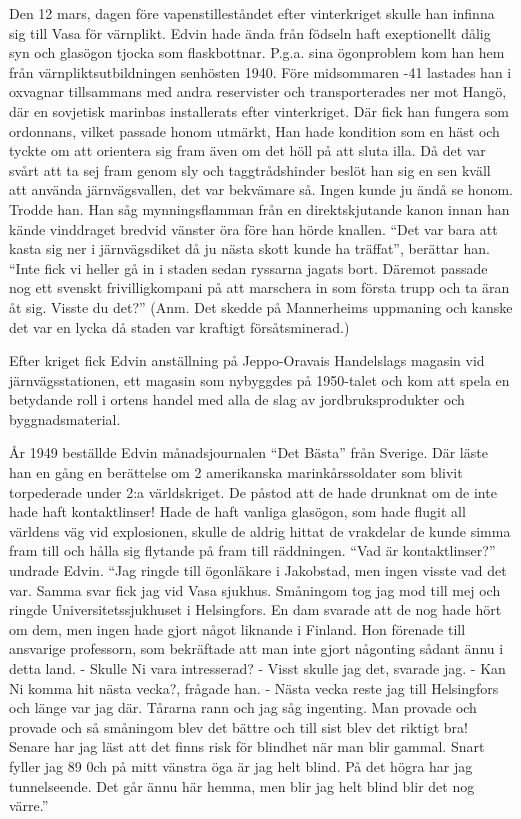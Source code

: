 Den 12 mars, dagen före vapenstilleståndet efter vinterkriget skulle han infinna sig till Vasa för värnplikt. Edvin hade ända från födseln haft exeptionellt dålig syn och glasögon tjocka som flaskbottnar. P.g.a. sina ögonproblem kom han hem från värnpliktsutbildningen senhösten 1940. Före midsommaren -41 lastades han i oxvagnar tillsammans med andra reservister och transporterades ner mot Hangö, där en sovjetisk marinbas installerats efter vinterkriget. Där fick han fungera som ordonnans, vilket passade honom utmärkt, Han hade kondition som en häst och tyckte om att orientera sig fram även om det höll på att sluta illa. Då det var svårt att ta sej fram genom sly och taggtrådshinder beslöt han sig en sen kväll att använda järnvägsvallen, det var bekvämare så. Ingen kunde ju ändå se honom. Trodde han. Han såg mynningsflamman från en direktskjutande kanon innan han kände vinddraget bredvid vänster öra före han hörde knallen. ``Det var bara att kasta sig ner i järnvägsdiket då ju nästa skott kunde ha träffat'', berättar han. ``Inte fick vi heller gå in i staden sedan ryssarna jagats bort. Däremot passade nog ett svenskt frivilligkompani på att marschera in som första trupp och ta äran åt sig. Visste du det?''
(Anm. Det skedde på Mannerheims uppmaning och kanske det var en lycka då staden var kraftigt försåtsminerad.)

Efter kriget fick Edvin anställning på Jeppo-Oravais Handelslags magasin vid järnvägsstationen, ett magasin som nybyggdes på 1950-talet och kom att spela en betydande roll i ortens handel med alla de slag av jordbruksprodukter och byggnadsmaterial.

År 1949 beställde Edvin månadsjournalen ``Det Bästa'' från Sverige. Där läste han en gång en berättelse om 2 amerikanska marinkårssoldater som blivit torpederade under 2:a världskriget. De påstod att de hade drunknat om de inte hade haft kontaktlinser! Hade de haft vanliga glasögon, som hade flugit all världens väg vid explosionen, skulle de aldrig hittat de vrakdelar de kunde simma fram till och hålla sig flytande på fram till räddningen. ``Vad är kontaktlinser?'' undrade Edvin. ``Jag ringde till ögonläkare i Jakobstad, men ingen visste vad det var. Samma svar fick jag vid Vasa sjukhus. Småningom tog jag mod till mej och ringde Universitetssjukhuset i Helsingfors. En dam svarade att de nog hade hört om dem, men ingen hade gjort något liknande i Finland. Hon förenade till ansvarige professorn, som bekräftade att man inte gjort någonting sådant ännu i detta land.\newline
\indent  - Skulle Ni vara intresserad? \newline
\indent  - Visst skulle jag det, svarade jag.\newline
\indent  - Kan Ni komma hit nästa vecka?, frågade han.\newline
\indent  - Nästa vecka reste jag till Helsingfors och länge var jag där. Tårarna rann och jag såg ingenting. Man provade och provade och så småningom blev det bättre och till sist blev det riktigt bra! Senare har jag läst att det finns risk för blindhet när man blir gammal. Snart fyller jag 89 0ch på mitt vänstra öga är jag helt blind. På det högra har jag tunnelseende. Det går ännu här hemma, men blir jag helt blind blir det nog värre.''

